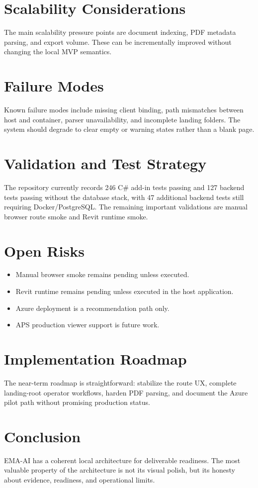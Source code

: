 \documentclass[11pt]{article}
\begin{document}
\section{Scalability Considerations}
The main scalability pressure points are document indexing, PDF metadata parsing, and export volume. These can be incrementally improved without changing the local MVP semantics.

\section{Failure Modes}
Known failure modes include missing client binding, path mismatches between host and container, parser unavailability, and incomplete landing folders. The system should degrade to clear empty or warning states rather than a blank page.

\section{Validation and Test Strategy}
The repository currently records 246 C\# add-in tests passing and 127 backend tests passing without the database stack, with 47 additional backend tests still requiring Docker/PostgreSQL. The remaining important validations are manual browser route smoke and Revit runtime smoke.

\section{Open Risks}
\begin{itemize}[leftmargin=*]
\item Manual browser smoke remains pending unless executed.
\item Revit runtime remains pending unless executed in the host application.
\item Azure deployment is a recommendation path only.
\item APS production viewer support is future work.
\end{itemize}

\section{Implementation Roadmap}
The near-term roadmap is straightforward: stabilize the route UX, complete landing-root operator workflows, harden PDF parsing, and document the Azure pilot path without promising production status.

\section{Conclusion}
EMA-AI has a coherent local architecture for deliverable readiness. The most valuable property of the architecture is not its visual polish, but its honesty about evidence, readiness, and operational limits.

\nocite{*}


\end{document}
